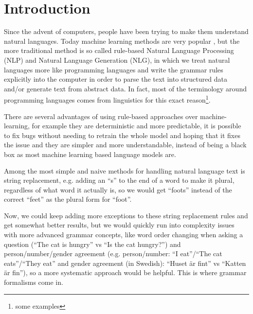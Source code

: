 \chapter{Introduction}

\newcommand{\note}[1]{\todo{#1}}
\renewcommand{\note}[1]{}


Since the advent of computers, people have been trying to make them understand \note{anthropomorphism?} natural languages. Today machine learning methods are very popular \note{rephrase}, but the more traditional method is so called rule-based Natural Language Processing (NLP) and Natural Language Generation (NLG), in which we treat natural languages more like programming languages and write the grammar rules explicitly into the computer in order to parse the text into structured data and/or generate text from abstract data.
In fact, most of the terminology around programming languages comes from linguistics for this exact reason\footnote{some examples}.

There are several advantages of using rule-based approaches over machine-learning, for example they are deterministic and more predictable, it is possible to fix bugs without needing to retrain the whole model and hoping that it fixes the issue and they are simpler and more understandable, instead of being a black box as most machine learning based language models are.


Among the most simple and naive methods for handling natural language text is string replacement, e.g. adding an ``s'' to the end of a word to make it plural, regardless of what word it actually is, so we would get ``foots'' instead of the correct ``feet'' as the plural form for ``foot''.

Now, we could keep adding more exceptions to these string replacement rules and get somewhat better results, but we would quickly run into complexity issues with more advanced grammar concepts, like word order changing when asking a question (``The cat is hungry'' vs ``Is the cat hungry?'') and person/number/gender agreement (e.g. person/number: ``I eat''/``The cat eats''/``They eat'' and gender agreement (in Swedish): ``Huset är fint'' vs ``Katten är fin''), so a more systematic approach would be helpful. This is where grammar formalisms come in.

